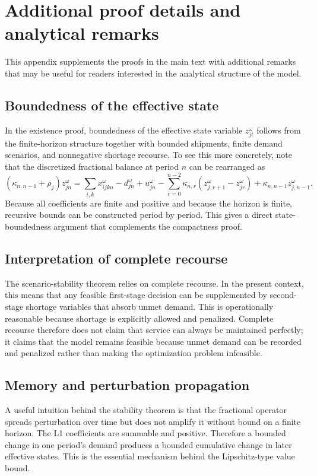 \section{Additional proof details and analytical remarks}
This appendix supplements the proofs in the main text with additional remarks that may be useful for readers interested in the analytical structure of the model.

\subsection{Boundedness of the effective state}
In the existence proof, boundedness of the effective state variable $z_{jt}^{\omega}$ follows from the finite-horizon structure together with bounded shipments, finite demand scenarios, and nonnegative shortage recourse. To see this more concretely, note that the discretized fractional balance at period $n$ can be rearranged as
\begin{equation}
\left(\kappa_{n,n-1}+\rho_j\right)z_{jn}^{\omega}
=\sum_{i,k}x_{ijkn}^{\omega}-d_{jn}^{\omega}+u_{jn}^{\omega}-\sum_{r=0}^{n-2}\kappa_{n,r}(z_{j,r+1}^{\omega}-z_{jr}^{\omega})+\kappa_{n,n-1}z_{j,n-1}^{\omega}.
\end{equation}
Because all coefficients are finite and positive and because the horizon is finite, recursive bounds can be constructed period by period. This gives a direct state-boundedness argument that complements the compactness proof.

\subsection{Interpretation of complete recourse}
The scenario-stability theorem relies on complete recourse. In the present context, this means that any feasible first-stage decision can be supplemented by second-stage shortage variables that absorb unmet demand. This is operationally reasonable because shortage is explicitly allowed and penalized. Complete recourse therefore does not claim that service can always be maintained perfectly; it claims that the model remains feasible because unmet demand can be recorded and penalized rather than making the optimization problem infeasible.

\subsection{Memory and perturbation propagation}
A useful intuition behind the stability theorem is that the fractional operator spreads perturbation over time but does not amplify it without bound on a finite horizon. The L1 coefficients are summable and positive. Therefore a bounded change in one period's demand produces a bounded cumulative change in later effective states. This is the essential mechanism behind the Lipschitz-type value bound.

